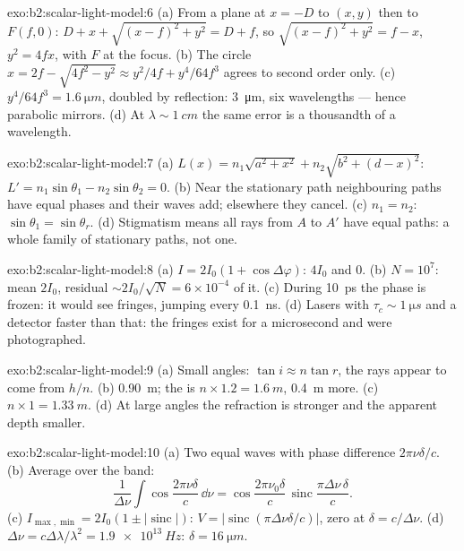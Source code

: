 \begin{solution}{exo:b2:scalar-light-model:6}
(a) From a plane  at $x = -D$ to $(x, y)$ then to $F(f, 0)$: $D + x
+ \sqrt{(x - f)^2 + y^2} = D + f$, so $\sqrt{(x - f)^2 + y^2} = f - x$, $y^2 = 4fx$,
with $F$ at the focus. (b) The circle $x = 2f - \sqrt{4f^2 - y^2} \approx y^2/4f +
y^4/64f^3$ agrees to second order only. (c) $y^4/64f^3 = \qty{1.6}{\micro m}$, doubled
by reflection: \qty{3}{\micro m}, six wavelengths --- hence parabolic
mirrors. (d) At $\lambda \sim \qty{1}{cm}$ the same error is a thousandth of a
wavelength.
\end{solution}

\begin{solution}{exo:b2:scalar-light-model:7}
(a) $L(x) = n_1\sqrt{a^2 + x^2} + n_2\sqrt{b^2 + (d - x)^2}$: $L' = n_1\sin\theta_1 -
n_2\sin\theta_2 = 0$. (b) Near the stationary path neighbouring paths have
equal phases and their waves add; elsewhere they cancel. (c) $n_1 = n_2$:
$\sin\theta_1 = \sin\theta_r$. (d) Stigmatism means all rays from $A$ to $A'$ have
equal paths: a whole family of stationary paths, not one.
\end{solution}

\begin{solution}{exo:b2:scalar-light-model:8}
(a) $I = 2I_0(1 + \cos\Delta\varphi)$: $4I_0$ and $0$. (b) $N = 10^7$: mean $2I_0$, residual
$\sim 2I_0/\sqrt N = 6 \times 10^{-4}$ of it. (c) During \qty{10}{ps} the phase is
frozen: it would see fringes, jumping every \qty{0.1}{ns}. (d) Lasers with
$\tau_c \sim \qty{1}{\micro s}$ and a detector faster than that: the fringes exist
for a microsecond and were photographed.
\end{solution}

\begin{solution}{exo:b2:scalar-light-model:9}
(a) Small angles: $\tan i \approx n\tan r$, the rays appear to come from $h/n$.
(b) \qty{0.90}{m}; the  is $n \times 1.2 = \qty{1.6}{m}$, \qty{0.4}{m} more.
(c) $n \times 1 = \qty{1.33}{m}$. (d) At large angles the refraction is stronger
and the apparent depth smaller.
\end{solution}

\begin{solution}{exo:b2:scalar-light-model:10}
(a) Two equal waves with phase difference $2\pi\nu\delta/c$. (b) Average
over the band:
\[
\frac1{\Delta\nu}\int\cos\frac{2\pi\nu\delta}c\,\dd\nu = \cos\frac{2\pi\nu_0\delta}c\,\operatorname{sinc}\frac{\pi\Delta\nu\,\delta}c .
\]
(c)
$I_{\max, \min} = 2I_0(1 \pm |\operatorname{sinc}|)$: $V = |\operatorname{sinc}(\pi\Delta\nu\delta/c)|$,
zero at $\delta = c/\Delta\nu$. (d) $\Delta\nu = c\Delta\lambda/\lambda^2 = \qty{1.9e13}{Hz}$: $\delta =
\qty{16}{\micro m}$.
\end{solution}

